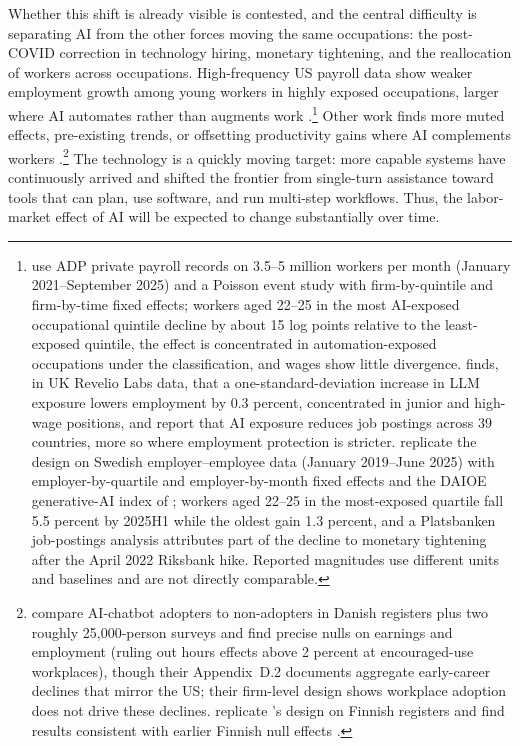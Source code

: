 \documentclass[12pt]{article}
\begin{document}
Whether this shift is already visible is contested, and the central difficulty is separating AI from the other forces moving the same occupations: the post-COVID correction in technology hiring, monetary tightening, and the reallocation of workers across occupations. High-frequency US payroll data show weaker employment growth among young workers in highly exposed occupations, larger where AI automates rather than augments work \citep{brynjolfsson2025}.\footnote{\citet{brynjolfsson2025} use ADP private payroll records on 3.5--5 million workers per month (January 2021--September 2025) and a Poisson event study with firm-by-quintile and firm-by-time fixed effects; workers aged 22--25 in the most AI-exposed occupational quintile decline by about 15 log points relative to the least-exposed quintile, the effect is concentrated in automation-exposed occupations under the \citet{handa2025} classification, and wages show little divergence. \citet{teeselink2025} finds, in UK Revelio Labs data, that a one-standard-deviation increase in LLM exposure lowers employment by 0.3 percent, concentrated in junior and high-wage positions, and \citet{teeselink2026} report that AI exposure reduces job postings across 39 countries, more so where employment protection is stricter. \citet{lodefalk2026} replicate the design on Swedish employer--employee data (January 2019--June 2025) with employer-by-quartile and employer-by-month fixed effects and the DAIOE generative-AI index of \citet{engberg2024}; workers aged 22--25 in the most-exposed quartile fall 5.5 percent by 2025H1 while the oldest gain 1.3 percent, and a Platsbanken job-postings analysis attributes part of the decline to monetary tightening after the April 2022 Riksbank hike. Reported magnitudes use different units and baselines and are not directly comparable.} Other work finds more muted effects, pre-existing trends, or offsetting productivity gains where AI complements workers \citep{humlum2026, kauhanen2026}.\footnote{\citet{humlum2026} compare AI-chatbot adopters to non-adopters in Danish registers plus two roughly 25,000-person surveys and find precise nulls on earnings and employment (ruling out hours effects above 2 percent at encouraged-use workplaces), though their Appendix~D.2 documents aggregate early-career declines that mirror the US; their firm-level design shows workplace adoption does not drive these declines. \citet{kauhanen2026} replicate \citet{brynjolfsson2025}'s design on Finnish registers and find results consistent with earlier Finnish null effects \citep{kauhanen2024, kauhanen2025}.} The technology is a quickly moving target: more capable systems have continuously arrived and shifted the frontier from single-turn assistance toward tools that can plan, use software, and run multi-step workflows. Thus, the labor-market effect of AI will be expected to change substantially over time.
\end{document}
